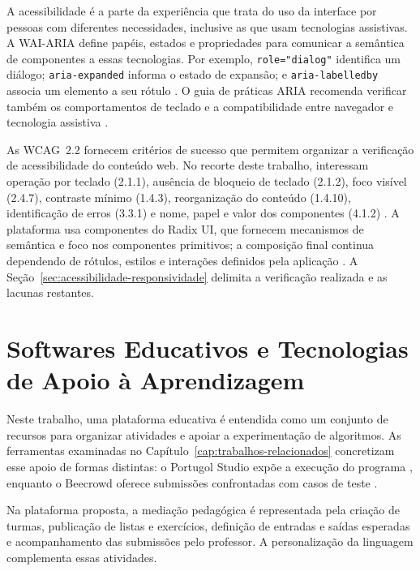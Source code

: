 A acessibilidade é a parte da experiência que trata do uso da interface por pessoas com diferentes necessidades, inclusive as que usam tecnologias assistivas. A WAI-ARIA define papéis, estados e propriedades para comunicar a semântica de componentes a essas tecnologias. Por exemplo, \texttt{role="dialog"} identifica um diálogo; \texttt{aria-expanded} informa o estado de expansão; e \texttt{aria-labelledby} associa um elemento a seu rótulo \cite{w3c2023aria}. O guia de práticas ARIA recomenda verificar também os comportamentos de teclado e a compatibilidade entre navegador e tecnologia assistiva \cite{w3capg2026}.

As WCAG~2.2 fornecem critérios de sucesso que permitem organizar a verificação de acessibilidade do conteúdo web. No recorte deste trabalho, interessam operação por teclado (2.1.1), ausência de bloqueio de teclado (2.1.2), foco visível (2.4.7), contraste mínimo (1.4.3), reorganização do conteúdo (1.4.10), identificação de erros (3.3.1) e nome, papel e valor dos componentes (4.1.2) \cite{w3cwcag22}. A plataforma usa componentes do Radix UI, que fornecem mecanismos de semântica e foco nos componentes primitivos; a composição final continua dependendo de rótulos, estilos e interações definidos pela aplicação \cite{radixaccess2026}. A Seção~\ref{sec:acessibilidade-responsividade} delimita a verificação realizada e as lacunas restantes.

\section{Softwares Educativos e Tecnologias de Apoio à Aprendizagem}
\label{sec:softwares-apoio}

Neste trabalho, uma plataforma educativa é entendida como um conjunto de recursos para organizar atividades e apoiar a experimentação de algoritmos. As ferramentas examinadas no Capítulo~\ref{cap:trabalhos-relacionados} concretizam esse apoio de formas distintas: o Portugol Studio expõe a execução do programa \cite{univali2026}, enquanto o Beecrowd oferece submissões confrontadas com casos de teste \cite{beecrowd2026faq}.

Na plataforma proposta, a mediação pedagógica é representada pela criação de turmas, publicação de listas e exercícios, definição de entradas e saídas esperadas e acompanhamento das submissões pelo professor. A personalização da linguagem complementa essas atividades.
